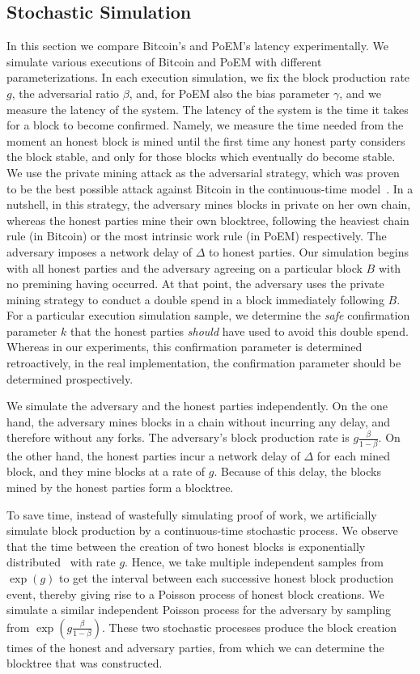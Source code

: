 \subsection{Stochastic Simulation}
In this section we compare Bitcoin's and PoEM's latency experimentally.
We simulate various executions of Bitcoin and PoEM with different parameterizations.
In each execution simulation, we fix the block production rate $g$, the adversarial ratio $\beta$,
and, for PoEM also the bias parameter $\gamma$, and we
measure the latency of the system.
The latency of the system is the time it takes for a block to become confirmed.
Namely, we measure the time needed from the moment an honest block is mined until
the first time any honest party considers the block stable, and only for those blocks
which eventually do become stable.
We use the private mining attack as the adversarial strategy, which was
proven~\cite{eiar} to be the best possible attack against Bitcoin in the continuous-time model~\cite{bitcoin-made-simple}.
In a nutshell, in this strategy, the adversary mines blocks in private on her own chain, whereas the honest parties mine
their own blocktree, following the heaviest chain rule (in Bitcoin) or the most intrinsic work rule (in PoEM) respectively.
The adversary imposes a network delay of $\Delta$ to honest parties.
Our simulation begins with all honest parties and the adversary agreeing on a particular block
$B$ with no premining having occurred. At that point, the adversary uses the private mining strategy
to conduct a double spend in a block immediately following $B$.
For a particular execution simulation sample, we determine the \emph{safe} confirmation parameter $k$
that the honest parties \emph{should} have used to avoid this double spend.
Whereas in our experiments, this confirmation parameter is determined retroactively,
in the real implementation, the confirmation parameter should be determined prospectively.

We simulate the adversary and the honest parties independently. On the one hand, the adversary mines blocks
in a chain without incurring any delay, and therefore without any forks. The adversary's block production rate is
$g\frac{\beta}{1 - \beta}$. On the other hand, the honest parties incur a network delay of $\Delta$ for each mined block,
and they mine blocks at a rate of $g$. Because of this delay, the blocks mined by the honest parties form a blocktree.

To save time, instead of wastefully simulating proof of work, we artificially simulate block production by a
continuous-time stochastic process.
We observe that the time between the creation of two honest blocks is exponentially distributed~\cite{bitcoin-made-simple}
with rate $g$.
Hence, we take multiple independent samples from $\exp(g)$ to get the interval between each successive honest block production event,
thereby giving rise to a Poisson process of honest block creations. We simulate a similar independent Poisson process for the adversary
by sampling from $\exp(g\frac{\beta}{1 - \beta})$. These two stochastic processes produce the block creation times of the honest and
adversary parties, from which we can determine the blocktree that was constructed.

